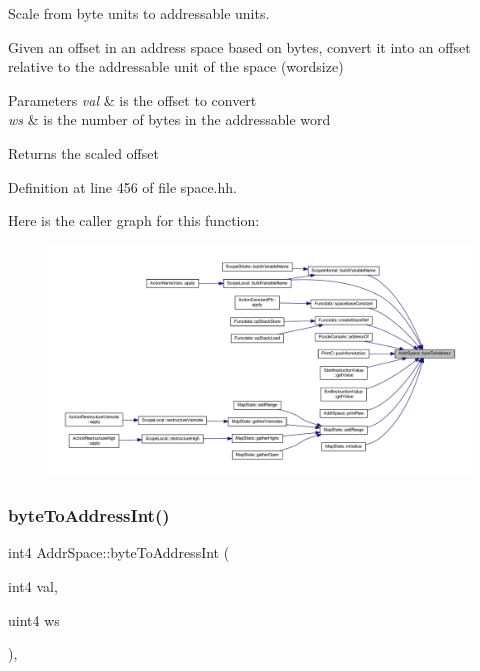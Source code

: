 Scale from byte units to addressable units. 

Given an offset in an address space based on bytes, convert it into an offset relative to the addressable unit of the space (wordsize) 
\begin{DoxyParams}{Parameters}
{\em val} & is the offset to convert \\
\hline
{\em ws} & is the number of bytes in the addressable word \\
\hline
\end{DoxyParams}
\begin{DoxyReturn}{Returns}
the scaled offset 
\end{DoxyReturn}


Definition at line 456 of file space.\+hh.

Here is the caller graph for this function\+:
\nopagebreak
\begin{figure}[H]
\begin{center}
\leavevmode
\includegraphics[width=350pt]{class_addr_space_a3c9149df492bdcaccc208eac261e8365_icgraph}
\end{center}
\end{figure}
\mbox{\label{class_addr_space_a082aa8e67257bcdcfc40d1280a3d0315}} 
\subsubsection{\texorpdfstring{byteToAddressInt()}{byteToAddressInt()}}
{\footnotesize\ttfamily int4 Addr\+Space\+::byte\+To\+Address\+Int (\begin{DoxyParamCaption}\item[{int4}]{val,  }\item[{uint4}]{ws }\end{DoxyParamCaption})\hspace{0.3cm}{\ttfamily [inline]}, {\ttfamily [static]}}



